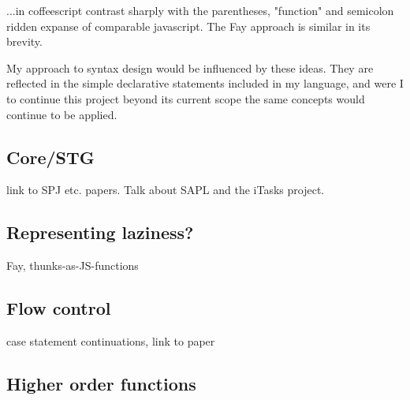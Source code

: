 \documentclass[11pt]{article}
\begin{document}
...in coffeescript contrast sharply with the parentheses, "function" and semicolon 
ridden expanse of comparable javascript. The Fay approach is similar in its brevity.

My approach to syntax design would be influenced by these ideas. They are reflected 
in the simple declarative statements included in my language, and were I to continue
this project beyond its current scope the same concepts would continue to be applied.


\subsection{Core/STG}
link to SPJ etc. papers. Talk about SAPL and the iTasks project.

\subsection{Representing laziness?}
Fay, thunks-as-JS-functions

\subsection{Flow control}
case statement continuations, link to paper

\subsection{Higher order functions}
\end{document}
